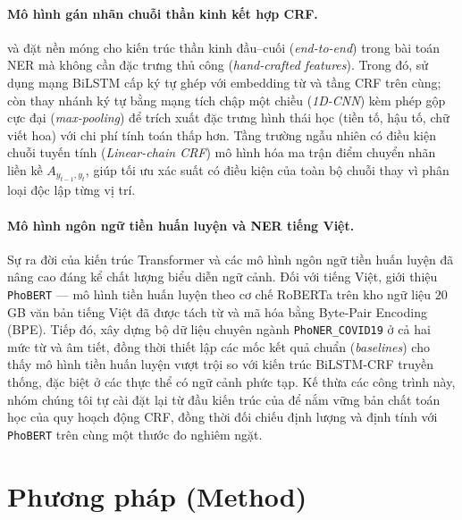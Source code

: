 \documentclass[11pt,a4paper,twocolumn]{article}
\begin{document}
\paragraph{Mô hình gán nhãn chuỗi thần kinh kết hợp CRF.}
\citet{lample-etal-2016-neural} và \citet{ma-hovy-2016-end} đặt nền móng cho kiến trúc thần kinh đầu--cuối (\textit{end-to-end}) trong bài toán NER mà không cần đặc trưng thủ công (\textit{hand-crafted features}). Trong đó, \citet{lample-etal-2016-neural} sử dụng mạng BiLSTM cấp ký tự ghép với embedding từ và tầng CRF trên cùng; còn \citet{ma-hovy-2016-end} thay nhánh ký tự bằng mạng tích chập một chiều (\textit{1D-CNN}) kèm phép gộp cực đại (\textit{max-pooling}) để trích xuất đặc trưng hình thái học (tiền tố, hậu tố, chữ viết hoa) với chi phí tính toán thấp hơn. Tầng trường ngẫu nhiên có điều kiện chuỗi tuyến tính (\textit{Linear-chain CRF}) mô hình hóa ma trận điểm chuyển nhãn liền kề $A_{y_{t-1}, y_t}$, giúp tối ưu xác suất có điều kiện của toàn bộ chuỗi thay vì phân loại độc lập từng vị trí.

\paragraph{Mô hình ngôn ngữ tiền huấn luyện và NER tiếng Việt.}
Sự ra đời của kiến trúc Transformer và các mô hình ngôn ngữ tiền huấn luyện đã nâng cao đáng kể chất lượng biểu diễn ngữ cảnh. Đối với tiếng Việt, \citet{nguyen-nguyen-2020-phobert} giới thiệu \texttt{PhoBERT} — mô hình tiền huấn luyện theo cơ chế RoBERTa trên kho ngữ liệu $20$GB văn bản tiếng Việt đã được tách từ và mã hóa bằng Byte-Pair Encoding (BPE). Tiếp đó, \citet{truong-etal-2021-covid} xây dựng bộ dữ liệu chuyên ngành \texttt{PhoNER\_COVID19} ở cả hai mức từ và âm tiết, đồng thời thiết lập các mốc kết quả chuẩn (\textit{baselines}) cho thấy mô hình tiền huấn luyện vượt trội so với kiến trúc BiLSTM-CRF truyền thống, đặc biệt ở các thực thể có ngữ cảnh phức tạp. Kế thừa các công trình này, nhóm chúng tôi tự cài đặt lại từ đầu kiến trúc của \citet{ma-hovy-2016-end} để nắm vững bản chất toán học của quy hoạch động CRF, đồng thời đối chiếu định lượng và định tính với \texttt{PhoBERT} trên cùng một thước đo nghiêm ngặt.

\section{Phương pháp (Method)}
\label{sec:method}
\end{document}

